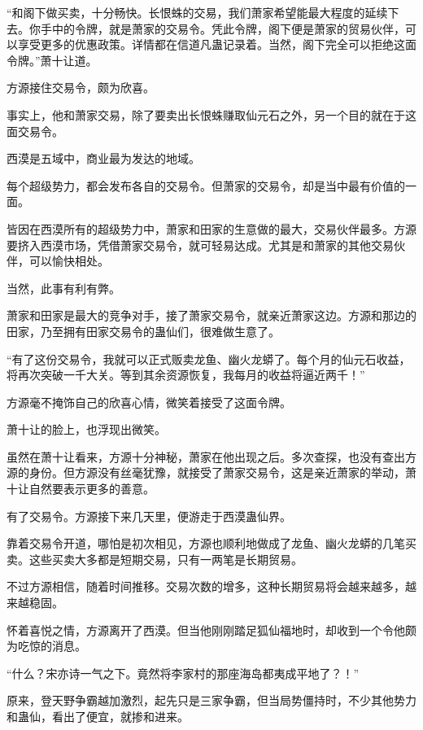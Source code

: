 
\begin{this_body}

“和阁下做买卖，十分畅快。长恨蛛的交易，我们萧家希望能最大程度的延续下去。你手中的令牌，就是萧家的交易令。凭此令牌，阁下便是萧家的贸易伙伴，可以享受更多的优惠政策。详情都在信道凡蛊记录着。当然，阁下完全可以拒绝这面令牌。”萧十让道。

方源接住交易令，颇为欣喜。

事实上，他和萧家交易，除了要卖出长恨蛛赚取仙元石之外，另一个目的就在于这面交易令。

西漠是五域中，商业最为发达的地域。

每个超级势力，都会发布各自的交易令。但萧家的交易令，却是当中最有价值的一面。

皆因在西漠所有的超级势力中，萧家和田家的生意做的最大，交易伙伴最多。方源要挤入西漠市场，凭借萧家交易令，就可轻易达成。尤其是和萧家的其他交易伙伴，可以愉快相处。

当然，此事有利有弊。

萧家和田家是最大的竞争对手，接了萧家交易令，就亲近萧家这边。方源和那边的田家，乃至拥有田家交易令的蛊仙们，很难做生意了。

“有了这份交易令，我就可以正式贩卖龙鱼、幽火龙蟒了。每个月的仙元石收益，将再次突破一千大关。等到其余资源恢复，我每月的收益将逼近两千！”

方源毫不掩饰自己的欣喜心情，微笑着接受了这面令牌。

萧十让的脸上，也浮现出微笑。

虽然在萧十让看来，方源十分神秘，萧家在他出现之后。多次查探，也没有查出方源的身份。但方源没有丝毫犹豫，就接受了萧家交易令，这是亲近萧家的举动，萧十让自然要表示更多的善意。

有了交易令。方源接下来几天里，便游走于西漠蛊仙界。

靠着交易令开道，哪怕是初次相见，方源也顺利地做成了龙鱼、幽火龙蟒的几笔买卖。这些买卖大多都是短期交易，只有一两笔是长期贸易。

不过方源相信，随着时间推移。交易次数的增多，这种长期贸易将会越来越多，越来越稳固。

怀着喜悦之情，方源离开了西漠。但当他刚刚踏足狐仙福地时，却收到一个令他颇为吃惊的消息。

“什么？宋亦诗一气之下。竟然将李家村的那座海岛都夷成平地了？！”

原来，登天野争霸越加激烈，起先只是三家争霸，但当局势僵持时，不少其他势力和蛊仙，看出了便宜，就掺和进来。


\end{this_body}
